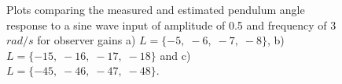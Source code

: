 \documentclass[12pt]{report}
\begin{document}
\begin{enumerate}
{\begin{figure}[htb!]
                  \caption{Plots comparing the measured and estimated pendulum angle response to a sine wave input of amplitude of 0.5 and frequency of 3 $rad/s$ for observer gains a) $L = \{-5,\; -6,\; -7,\; -8\}$, b) $L = \{-15,\; -16,\; -17,\; -18\}$ and c) $L = \{-45,\; -46,\; -47,\; -48\}$.}
              \end{figure}
          }
\end{enumerate}
\newpage
%
\end{document}
